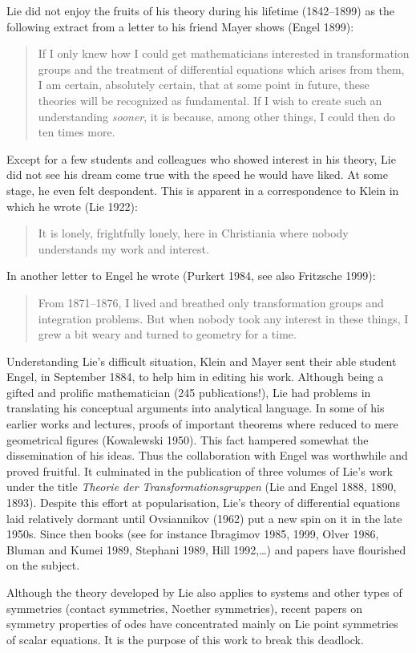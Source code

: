 Lie did not enjoy the fruits of his theory during his lifetime
(1842--1899) as the
following extract from a letter to his friend Mayer shows (Engel 1899):
\begin{quote}
If I only knew how I could get mathematicians interested in transformation
groups and the treatment of differential equations which arises from them,
I am certain, absolutely certain, that at some point in future, these
theories will be recognized as fundamental. If I wish to create such an
understanding {\em sooner}, it is because, among other things, I could then do
ten times more.
\end{quote}
Except for a few students and colleagues who showed interest in his theory,
Lie
did not see his dream come true with the speed he would have liked. At some
stage, he even felt despondent. This is apparent in a correspondence to Klein
in  which he wrote (Lie 1922):
\begin{quote}
It is lonely, frightfully lonely, here in Christiania where nobody
understands my work and interest.
\end{quote}
In another letter to Engel he wrote (Purkert 1984, see also Fritzsche 1999):
\begin{quote}
From 1871--1876, I lived and breathed only transformation groups and
integration problems. But when nobody took any interest in these things,
I grew  a bit weary and turned to geometry for a time.
\end{quote}
Understanding Lie's difficult situation, Klein and Mayer sent their able
student Engel, in September 1884, to help him in editing his work.
Although being a gifted and prolific mathematician (245 publications!),
Lie had problems in translating his conceptual arguments into
analytical language. In some of his earlier works and lectures,
proofs of important theorems where reduced to mere geometrical figures
(Kowalewski 1950). This fact hampered
somewhat the dissemination of his ideas. Thus
the collaboration with Engel was worthwhile and proved fruitful. It
culminated in the publication of three volumes of
Lie's work
under the title {\em Theorie der Transformationsgruppen}
(Lie and Engel 1888, 1890, 1893). Despite this effort at popularisation,
Lie's theory
of differential equations laid relatively dormant until Ovsiannikov (1962)
put a new spin on it in the late 1950s. Since then books (see for instance
Ibragimov 1985, 1999, Olver 1986, Bluman and Kumei 1989, Stephani 1989,
Hill 1992,\ldots) and papers have flourished on the subject. 

Although the theory developed by Lie also applies to systems and other types
of symmetries (contact symmetries, Noether symmetries), recent papers on
symmetry properties of odes have concentrated mainly on Lie point
symmetries of scalar equations. It is the purpose of this work to break this
deadlock.

